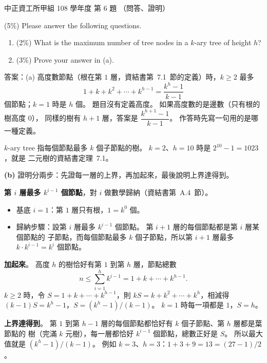 \begin{pastexam}[label={px:ccu-108-swa-05}]{中正資工所甲組 108 學年度 第 6 題}
（問答、證明）

(5\%) Please answer the following questions.
\begin{enumerate}[label=(\alph*)]
\item (2\%) What is the maximum number of tree nodes in a $k$-ary tree of height $h$?
\item (3\%) Prove your answer in (a).
\end{enumerate}
\end{pastexam}

\begin{pastsoln}
答案：(a) 高度數節點（根在第 $1$ 層，資結書第~7.1~節的定義）時，$k \ge 2$ 最多
\[
1 + k + k^2 + \cdots + k^{h-1} = \frac{k^h - 1}{k - 1}
\]
個節點；$k = 1$ 時是 $h$ 個。 題目沒有定義高度。 如果高度數的是邊數（只有根的樹高度 $0$），
同樣的樹有 $h + 1$ 層，答案是 $\dfrac{k^{h+1} - 1}{k - 1}$。 作答時先寫一句用的是哪一種定義。

$k$-ary tree 指每個節點最多 $k$ 個子節點的樹。 $k = 2$、$h = 10$ 時是 $2^{10} - 1 = 1023$，就是
二元樹的資結書定理~7.1。

\textbf{(b)} 證明分兩步：先證每一層的上界，再加起來，最後說明上界達得到。

\textbf{第 $i$ 層最多 $k^{i-1}$ 個節點}，對 $i$ 做數學歸納（資結書第~A.4~節）。
\begin{itemize}
\item 基底 $i = 1$：第 $1$ 層只有根，$1 = k^0$ 個。
\item 歸納步驟：設第 $i$ 層最多 $k^{i-1}$ 個節點。 第 $i + 1$ 層的每個節點都是第 $i$ 層某個節點的
子節點，而每個節點最多 $k$ 個子節點，所以第 $i + 1$ 層最多 $k \cdot k^{i-1} = k^i$ 個節點。
\end{itemize}

\textbf{加起來}。 高度 $h$ 的樹恰好有第 $1$ 到第 $h$ 層，節點總數
\[
n \le \sum_{i=1}^{h} k^{i-1} = 1 + k + \cdots + k^{h-1}.
\]
$k \ge 2$ 時，令 $S = 1 + k + \cdots + k^{h-1}$，則 $kS = k + k^2 + \cdots + k^h$，相減得
$(k - 1)S = k^h - 1$，$S = (k^h - 1)/(k - 1)$。 $k = 1$ 時每一項都是 $1$，$S = h$。

\textbf{上界達得到}。 第 $1$ 到第 $h - 1$ 層的每個節點都恰好有 $k$ 個子節點、第 $h$ 層都是葉節點的
樹（完滿 $k$ 元樹），每一層都恰好 $k^{i-1}$ 個節點，總數正好是 $S$。 所以最大值就是
$(k^h - 1)/(k - 1)$。 例如 $k = 3$、$h = 3$：$1 + 3 + 9 = 13 = (27 - 1)/2$。
\end{pastsoln}
